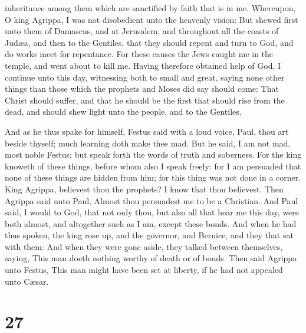 inheritance among them which are sanctified by faith that is in me.
 Whereupon, O king Agrippa, I was not disobedient unto the
heavenly vision:  But shewed first unto them of Damascus,
and at Jerusalem, and throughout all the coasts of Judæa, and then to
the Gentiles, that they should repent and turn to God, and do works meet
for repentance.  For these causes the Jews caught me in the
temple, and went about to kill me.  Having therefore
obtained help of God, I continue unto this day, witnessing both to small
and great, saying none other things than those which the prophets and
Moses did say should come:  That Christ should suffer, and
that he should be the first that should rise from the dead, and should
shew light unto the people, and to the Gentiles.

 And as he thus spake for himself, Festus said with a loud
voice, Paul, thou art beside thyself; much learning doth make thee mad.
 But he said, I am not mad, most noble Festus; but speak
forth the words of truth and soberness.  For the king
knoweth of these things, before whom also I speak freely: for I am
persuaded that none of these things are hidden from him; for this thing
was not done in a corner.  King Agrippa, believest thou the
prophets? I know that thou believest.  Then Agrippa said
unto Paul, Almost thou persuadest me to be a Christian. 
And Paul said, I would to God, that not only thou, but also all that
hear me this day, were both almost, and altogether such as I am, except
these bonds.  And when he had thus spoken, the king rose
up, and the governor, and Bernice, and they that sat with them:
 And when they were gone aside, they talked between
themselves, saying, This man doeth nothing worthy of death or of bonds.
 Then said Agrippa unto Festus, This man might have been
set at liberty, if he had not appealed unto Cæsar.

\hypertarget{section-26}{%
\section{27}\label{section-26}}

